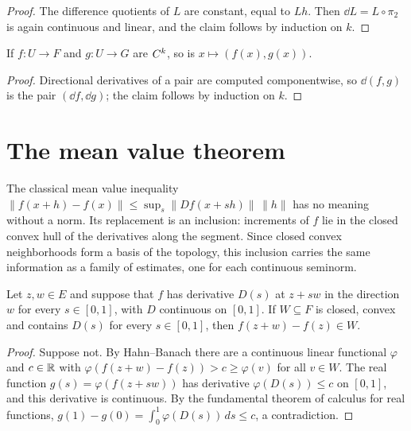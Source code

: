 \begin{proof}
  \leanok
  The difference quotients of $L$ are constant, equal to $Lh$. Then $\dd L = L \circ \pi_2$ is
  again continuous and linear, and the claim follows by induction on $k$.
\end{proof}

\begin{lemma}[Pairs]
  \label{lem:prod}
  \leanok
  If $f \colon U \to F$ and $g \colon U \to G$ are $C^{k}$, so is $x \mapsto (f(x), g(x))$.
\end{lemma}

\begin{proof}
  \leanok
  Directional derivatives of a pair are computed componentwise, so $\dd (f,g)$ is the pair
  $(\dd f, \dd g)$; the claim follows by induction on $k$.
\end{proof}

\section{The mean value theorem}

The classical mean value inequality $\|f(x+h) - f(x)\| \leq \sup_s \|Df(x+sh)\|\,\|h\|$ has no
meaning without a norm. Its replacement is an inclusion: increments of $f$ lie in the closed
convex hull of the derivatives along the segment. Since closed convex neighborhoods form a
basis of the topology, this inclusion carries the same information as a family of estimates,
one for each continuous seminorm.

\begin{lemma}
  \label{lem:mean-value-inclusion}
  \leanok
  Let $z, w \in E$ and suppose that $f$ has derivative $D(s)$ at $z + s w$ in the direction $w$
  for every $s \in [0,1]$, with $D$ continuous on $[0,1]$. If $W \subseteq F$ is closed, convex
  and contains $D(s)$ for every $s \in [0,1]$, then $f(z + w) - f(z) \in W$.
\end{lemma}

\begin{proof}
  \leanok
  Suppose not. By Hahn--Banach there are a continuous linear functional $\varphi$ and $c \in \mathbb{R}$
  with $\varphi(f(z+w) - f(z)) > c \geq \varphi(v)$ for all $v \in W$. The real function
  $g(s) = \varphi(f(z + s w))$ has derivative $\varphi(D(s)) \leq c$ on $[0,1]$, and this
  derivative is continuous. By the fundamental theorem of calculus for real functions,
  $g(1) - g(0) = \int_0^1 \varphi(D(s))\,ds \leq c$, a contradiction.
\end{proof}

